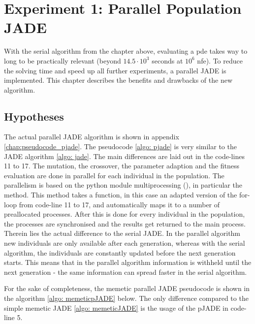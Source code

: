 \documentclass[./\jobname.tex]{subfiles}
\begin{document}
\chapter {Experiment 1: Parallel Population JADE}
\label{chap:experimet_1}

With the serial algorithm from the chapter above, evaluating a \gls{pde} takes way to long to be practically relevant (beyond $14.5 \cdot 10^3$ seconds at $10^6$ \gls{nfe}). To reduce the solving time and speed up all further experiments, a parallel JADE is implemented. This chapter describes the benefits and drawbacks of the new algorithm.  

\section{Hypotheses}
The actual parallel JADE algorithm is shown in appendix \ref{chap:pseudocode_pjade}. The pseudocode \ref{algo: pjade} is very similar to the JADE algorithm \ref{algo: jade}. The main differences are laid out in the code-lines 11 to 17. The mutation, the crossover, the parameter adaption and the fitness evaluation are done in parallel for each individual in the population. The parallelism is based on the python module multiprocessing (\cite{python_standard_library_multiprocessing_2020}), in particular the  method. This method takes a function, in this case an adapted version of the for-loop from code-line 11 to 17, and automatically maps it to a number of preallocated processes. After this is done for every individual in the population, the processes are synchronised and the results get returned to the main process. Therein lies the actual difference to the serial JADE. In the parallel algorithm new individuals are only available after each generation, whereas with the serial algorithm, the individuals are constantly updated before the next generation starts. This means that in the parallel algorithm information is withheld until the next generation - the same information can spread faster in the serial algorithm.  

For the sake of completeness, the memetic parallel JADE pseudocode is shown in the algorithm \ref{algo: memeticpJADE} below. The only difference compared to the simple memetic JADE \ref{algo: memeticJADE} is the usage of the pJADE in code-line 5. 

\begin{algorithm}[h]
	\SetAlgoNoLine
	\DontPrintSemicolon
	\label{algo: memeticpJADE}
\end{algorithm}
\end{document}
